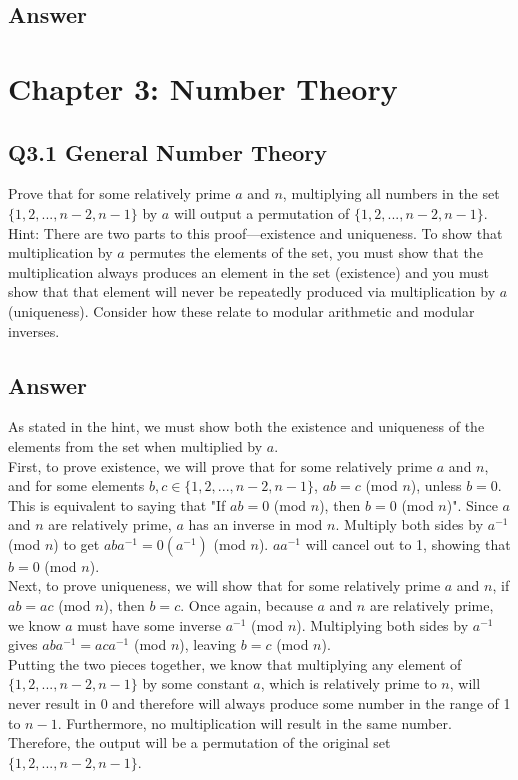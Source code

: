 \documentclass{article}
\begin{document}
\subsection*{Answer}
\newpage
\section*{Chapter 3: Number Theory}
\subsection*{Q3.1 General Number Theory}
Prove that for some relatively prime $a$ and $n$, multiplying all numbers in the set $\{1,2,...,n-2,n-1\}$ by $a$ will output a permutation of $\{1,2,...,n-2,n-1\}$.
\\ Hint: There are two parts to this proof---existence and uniqueness. To show that multiplication by $a$ permutes the elements of the set, you must show that the multiplication always produces an element in the set (existence) and you must show that that element will never be repeatedly produced via multiplication by $a$ (uniqueness). Consider how these relate to modular arithmetic and modular inverses.
\newpage
\subsection*{Answer}
As stated in the hint, we must show both the existence and uniqueness of the elements from the set when multiplied by $a$.
\\ First, to prove existence, we will prove that for some relatively prime $a$ and $n$, and for some elements $b,c\in \{1,2,...,n-2,n-1\}$,  $ab=c$ (mod $n$), unless $b=0$. This is equivalent to saying that "If $ab=0$ (mod $n$), then $b=0$ (mod $n$)". Since $a$ and $n$ are relatively prime, $a$ has an inverse in mod $n$. Multiply both sides by $a^{-1}$ (mod $n$) to get $aba^{-1}=0(a^{-1})$ (mod $n$). $aa^{-1}$ will cancel out to 1, showing that $b=0$ (mod $n$).
\\ Next, to prove uniqueness, we will show that for some relatively prime $a$ and $n$, if $ab=ac$ (mod $n$), then $b=c$. Once again, because $a$ and $n$ are relatively prime, we know $a$ must have some inverse $a^{-1}$ (mod $n$). Multiplying both sides by $a^{-1}$ gives $aba^{-1}=aca^{-1}$ (mod $n$), leaving $b=c$ (mod $n$).
\\ Putting the two pieces together, we know that multiplying any element of $\{1,2,...,n-2,n-1\}$ by some constant $a$, which is relatively prime to $n$, will never result in 0 and therefore will always produce some number in the range of 1 to $n-1$. Furthermore, no multiplication will result in the same number. Therefore, the output will be a permutation of the original set $\{1,2,...,n-2,n-1\}$.
\newpage
\end{document}
